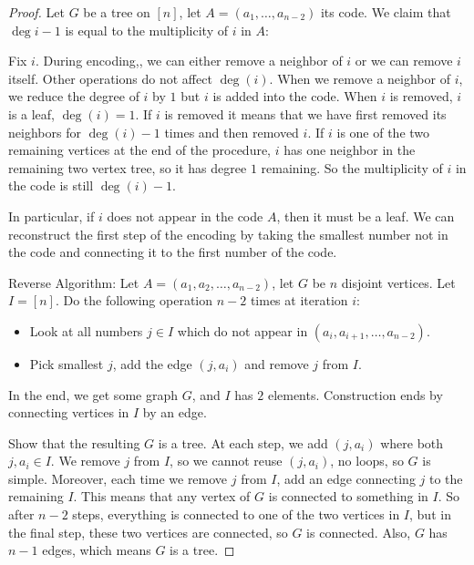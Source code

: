 \documentclass{report}
\begin{document}
\begin{proof}
    Let $G$ be a tree on $[n]$, let $A = (a_{1}, \ldots, a_{n - 2})$ its code. We claim that $\deg i - 1$ is equal to the multiplicity of $i$ in $A$: 

    Fix $i$. During encoding,, we can either remove a neighbor of $i$ or we can remove $i$ itself. Other operations do not affect $\deg(i)$. When we remove a neighbor of $i$, we reduce the degree of $i$ by $1$ but $i$ is added into the code. When $i$ is removed, $i$ is a leaf, $\deg (i) = 1$. If $i$ is removed it means that we have first removed its neighbors for $\deg (i) - 1$ times and then removed $i$. If $i$ is one of the two remaining vertices at the end of the procedure, $i$ has one neighbor in the remaining two vertex tree, so it has degree $1$ remaining. So the multiplicity of $i$ in the code is still $\deg(i) - 1$.

    In particular, if $i$ does not appear in the code $A$, then it must be a leaf. We can reconstruct the first step of the encoding by taking the smallest number not in the code and connecting it to the first number of the code.

    Reverse Algorithm: Let $A = (a_{1}, a_{2}, \ldots, a_{n - 2})$, let $G$ be $n$ disjoint vertices. Let $I = [n]$. Do the following operation $n - 2$ times at iteration $i$:
        \begin{itemize}
            \item Look at all numbers $j \in I$ which do not appear in $(a_{i}, a_{i + 1}, \ldots, a_{n - 2})$.

            \item Pick smallest $j$, add the edge $(j, a_{i})$ and remove $j$ from $I$. 
        \end{itemize}
    In the end, we get some graph $G$, and $I$ has $2$ elements. Construction ends by connecting vertices in $I$ by an edge. 

    Show that the resulting $G$ is a tree. At each step, we add $(j, a_{i})$ where both $j, a_{i} \in I$. We remove $j$ from $I$, so we cannot reuse $(j, a_{i})$, no loops, so $G$ is simple. Moreover, each time we remove $j$ from $I$, add an edge connecting $j$ to the remaining $I$. This means that any vertex of $G$ is connected to something in $I$. So after $n - 2$ steps, everything is connected to one of the two vertices in $I$, but in the final step, these two vertices are connected, so $G$ is connected. Also, $G$ has $n - 1$ edges, which means $G$ is a tree.
\end{proof}
\end{document}
